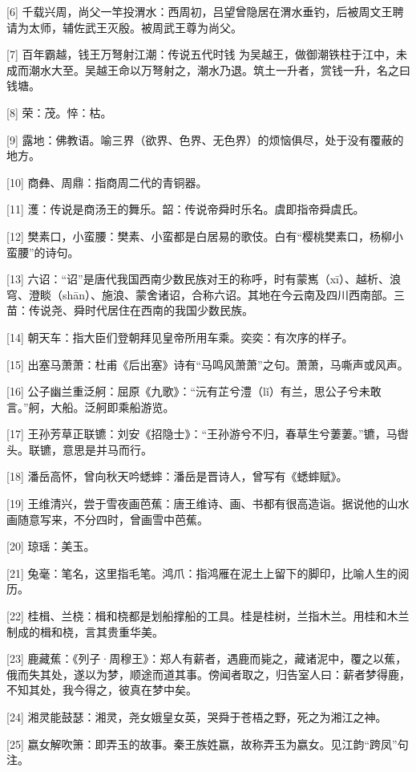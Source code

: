 \documentclass[12pt,UTF8]{ctexbook}
\begin{document}
[6] 千载兴周，尚父一竿投渭水：西周初，吕望曾隐居在渭水垂钓，后被周文王聘请为太师，辅佐武王灭殷。被周武王尊为尚父。

[7] 百年霸越，钱王万弩射江潮：传说五代时钱 为吴越王，做御潮铁柱于江中，未成而潮水大至。吴越王命以万弩射之，潮水乃退。筑土一升者，赏钱一升，名之曰钱塘。

[8] 荣：茂。悴：枯。

[9] 露地：佛教语。喻三界（欲界、色界、无色界）的烦恼俱尽，处于没有覆蔽的地方。

[10] 商彝、周鼎：指商周二代的青铜器。

[11] 濩：传说是商汤王的舞乐。韶：传说帝舜时乐名。虞即指帝舜虞氏。

[12] 樊素口，小蛮腰：樊素、小蛮都是白居易的歌伎。白有“樱桃樊素口，杨柳小蛮腰”的诗句。

[13] 六诏：“诏”是唐代我国西南少数民族对王的称呼，时有蒙嶲（xī）、越析、浪穹、澄睒（shān）、施浪、蒙舍诸诏，合称六诏。其地在今云南及四川西南部。三苗：传说尧、舜时代居住在西南的我国少数民族。

[14] 朝天车：指大臣们登朝拜见皇帝所用车乘。奕奕：有次序的样子。

[15] 出塞马萧萧：杜甫《后出塞》诗有“马鸣风萧萧”之句。萧萧，马嘶声或风声。

[16] 公子幽兰重泛舸：屈原《九歌》：“沅有芷兮澧（lǐ）有兰，思公子兮未敢言。”舸，大船。泛舸即乘船游览。

[17] 王孙芳草正联镳：刘安《招隐士》：“王孙游兮不归，春草生兮萋萋。”镳，马辔头。联镳，意思是并马而行。

[18] 潘岳高怀，曾向秋天吟蟋蟀：潘岳是晋诗人，曾写有《蟋蟀赋》。

[19] 王维清兴，尝于雪夜画芭蕉：唐王维诗、画、书都有很高造诣。据说他的山水画随意写来，不分四时，曾画雪中芭蕉。

[20] 琼瑶：美玉。

[21] 兔毫：笔名，这里指毛笔。鸿爪：指鸿雁在泥土上留下的脚印，比喻人生的阅历。

[22] 桂楫、兰桡：楫和桡都是划船撑船的工具。桂是桂树，兰指木兰。用桂和木兰制成的楫和桡，言其贵重华美。

[23] 鹿藏蕉：《列子·周穆王》：郑人有薪者，遇鹿而毙之，藏诸泥中，覆之以蕉，俄而失其处，遂以为梦，顺途而道其事。傍闻者取之，归告室人曰：薪者梦得鹿，不知其处，我今得之，彼真在梦中矣。

[24] 湘灵能鼓瑟：湘灵，尧女娥皇女英，哭舜于苍梧之野，死之为湘江之神。

[25] 嬴女解吹箫：即弄玉的故事。秦王族姓嬴，故称弄玉为嬴女。见江韵“跨凤”句注。
\end{document}
